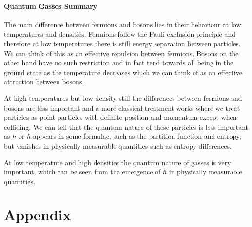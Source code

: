 \documentclass[a4paper]{article}
\begin{document}
    \subsection{Quantum Gasses Summary}
    The main difference between fermions and bosons lies in their behaviour at low temperatures and densities.
    Fermions follow the Pauli exclusion principle and therefore at low temperatures there is still energy separation between particles.
    We can think of this as an effective repulsion between fermions.
    Bosons on the other hand have no such restriction and in fact tend towards all being in the ground state as the temperature decreases which we can think of as an effective attraction between bosons.
    
    At high temperatures but low density still the differences between fermions and bosons are less important and a more classical treatment works where we treat particles as point particles with definite position and momentum except when colliding.
    We can tell that the quantum nature of these particles is less important as \(h\) or \(\hbar\) appears in some formulae, such as the partition function and entropy, but vanishes in physically measurable quantities such as entropy differences.
    
    At low temperature and high densities the quantum nature of gasses is very important, which can be seen from the emergence of \(\hbar\) in physically measurable quantities.
    \tikzexternaldisable
    \clearpage
    \appendix
    \part*{Appendix}
    \begingroup
    \let\clearpage\relax
    
    
    \endgroup
\end{document}
